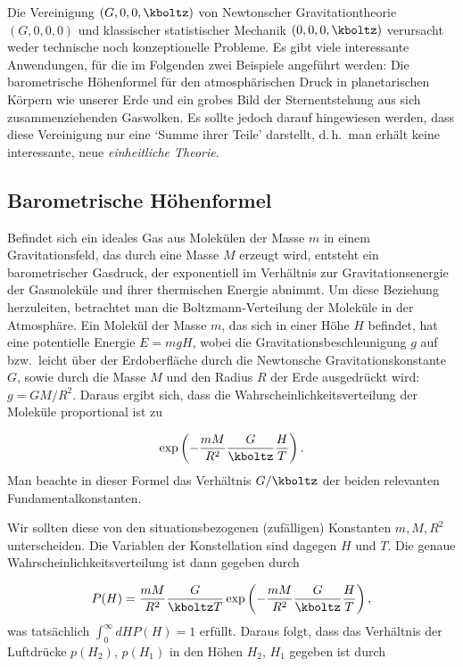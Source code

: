 
\newpage {}
\label{sec:1001}

Die Vereinigung $(G,0,0,\kboltz)$ von Newtonscher Gravitationtheorie $(G,0,0,0)$ und klassischer statistischer Mechanik $(0,0,0,\kboltz)$ verursacht weder technische noch konzeptionelle Probleme. Es gibt viele interessante Anwendungen, für die im Folgenden zwei Beispiele angeführt werden: Die barometrische Höhenformel für den atmosphärischen Druck in planetarischen Körpern wie unserer Erde und ein grobes Bild der Sternentstehung aus sich zusammenziehenden Gaswolken. Es sollte jedoch darauf hingewiesen werden, dass diese Vereinigung nur eine \enquote*{Summe ihrer Teile} darstellt, d.\,h.\ man erhält keine interessante, neue \emph{einheitliche Theorie}.


\subsection*{Barometrische Höhenformel}

Befindet sich ein ideales Gas aus Molekülen der Masse $m$ in einem Gravitationsfeld, das durch eine Masse $M$ erzeugt wird, entsteht ein barometrischer Gasdruck, der exponentiell im Verhältnis zur Gravitationsenergie der Gasmoleküle und ihrer thermischen Energie abnimmt. Um diese Beziehung herzuleiten, betrachtet man die Boltzmann-Verteilung der Moleküle in der Atmosphäre. Ein Molekül der Masse $m$, das sich in einer Höhe $H$ befindet, hat eine potentielle Energie $E=m g H$, wobei die Gravitationsbeschleunigung $g$ auf bzw.\ leicht über der Erdoberfläche durch die Newtonsche Gravitationskonstante $G$, sowie durch die Masse $M$ und den Radius $R$ der Erde ausgedrückt wird: $g=G M/R^2$. Daraus ergibt sich, dass die Wahrscheinlichkeitsverteilung der Moleküle proportional ist zu 

\begin{equation*}\label{eq:barometric_height}
  \exp\left(-\frac{m M}{R^2}\frac{G}{\kboltz} \frac{H}{T}\right).
\end{equation*}
%
Man beachte in dieser Formel das Verhältnis $G/\kboltz$ der beiden relevanten Fundamentalkonstanten.

Wir sollten diese von den situationsbezogenen (zufälligen) Konstanten $m, M, R^2$ unterscheiden. Die Variablen der Konstellation sind dagegen $H$ und $T$. Die genaue Wahrscheinlichkeitsverteilung ist dann gegeben durch

\begin{equation*}\label{eq:barometric_height_full_1}
  P(H)=\frac{m M}{R^2}\frac{G}{\kboltz T} \exp\left(-\frac{m M}{R^2}\frac{G}{\kboltz} \frac{H}{T}\right),
\end{equation*} 
%
was tatsächlich $\int_0^\infty dH P(H)=1$ erfüllt. Daraus folgt, dass das Verhältnis der Luftdrücke $p(H_2)$, $p(H_1)$ in den Höhen $H_2$, $H_1$ gegeben ist durch

